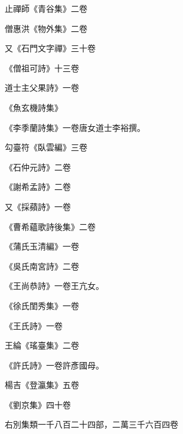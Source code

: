 \begin{pinyinscope}
 止禪師《青谷集》二卷



 僧惠洪《物外集》二卷



 又《石門文字禪》三十卷



 《僧祖可詩》十三卷



 道士主父果詩》一卷



 《魚玄機詩集》



 《李季蘭詩集》一卷唐女道士李裕撰。



 勾臺符《臥雲編》三卷



 《石仲元詩》二卷



 《謝希孟詩》二卷



 又《採蘋詩》一卷



 《曹希蘊歌詩後集》二卷



 《蒲氏玉清編》一卷



 《吳氏南宮詩》二卷



 《王尚恭詩》一卷王亢女。



 《徐氏閨秀集》一卷



 《王氏詩》一卷



 王綸《瑤臺集》二卷



 《許氏詩》一卷許彥國母。



 楊吉《登瀛集》五卷



 《劉京集》四十卷



 右別集類一千八百二十四部，二萬三千六百四卷



\end{pinyinscope}